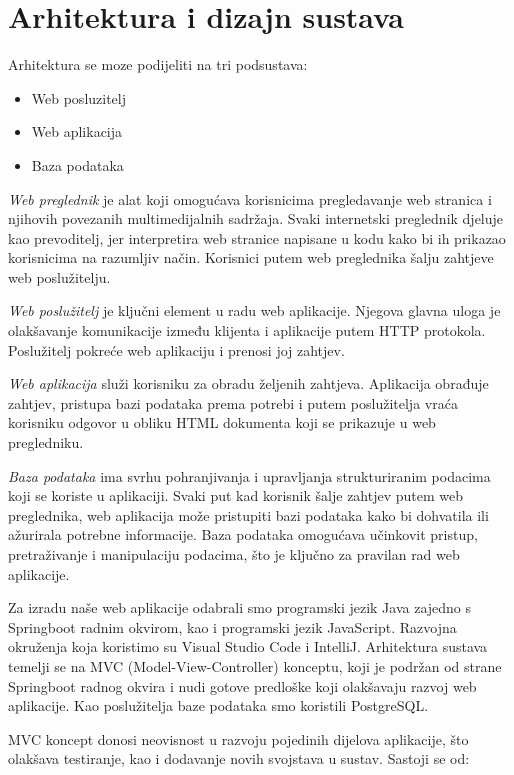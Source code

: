 \chapter{Arhitektura i dizajn sustava}
		
	Arhitektura se moze podijeliti na tri podsustava:
	
	\begin{itemize}
		\item Web posluzitelj
		\item Web aplikacija
		\item Baza podataka
	\end{itemize}

	
	\textit{Web preglednik} je alat koji omogućava korisnicima pregledavanje web stranica i njihovih povezanih multimedijalnih sadržaja. Svaki internetski preglednik djeluje kao prevoditelj, jer interpretira web stranice napisane u kodu kako bi ih prikazao korisnicima na razumljiv način. Korisnici putem web preglednika šalju zahtjeve web poslužitelju.
	
	\textit{Web poslužitelj} je ključni element u radu web aplikacije. Njegova glavna uloga je olakšavanje komunikacije između klijenta i aplikacije putem HTTP protokola. Poslužitelj pokreće web aplikaciju i prenosi joj zahtjev.
	
	\textit{Web aplikacija} služi korisniku za obradu željenih zahtjeva. Aplikacija obrađuje zahtjev, pristupa bazi podataka prema potrebi i putem poslužitelja vraća korisniku odgovor u obliku HTML dokumenta koji se prikazuje u web pregledniku.
	
	\textit{Baza podataka} ima svrhu pohranjivanja i upravljanja strukturiranim podacima koji se koriste u aplikaciji. Svaki put kad korisnik šalje zahtjev putem web preglednika, web aplikacija može pristupiti bazi podataka kako bi dohvatila ili ažurirala potrebne informacije. Baza podataka omogućava učinkovit pristup, pretraživanje i manipulaciju podacima, što je ključno za pravilan rad web aplikacije.
	
	Za izradu naše web aplikacije odabrali smo programski jezik Java zajedno s Springboot radnim okvirom, kao i programski jezik JavaScript. Razvojna okruženja koja koristimo su Visual Studio Code i IntelliJ. Arhitektura sustava temelji se na MVC (Model-View-Controller) konceptu, koji je podržan od strane Springboot radnog okvira i nudi gotove predloške koji olakšavaju razvoj web aplikacije. Kao poslužitelja baze podataka smo koristili PostgreSQL.
	
	MVC koncept donosi neovisnost u razvoju pojedinih dijelova aplikacije, što olakšava testiranje, kao i dodavanje novih svojstava u sustav. Sastoji se od:
	
